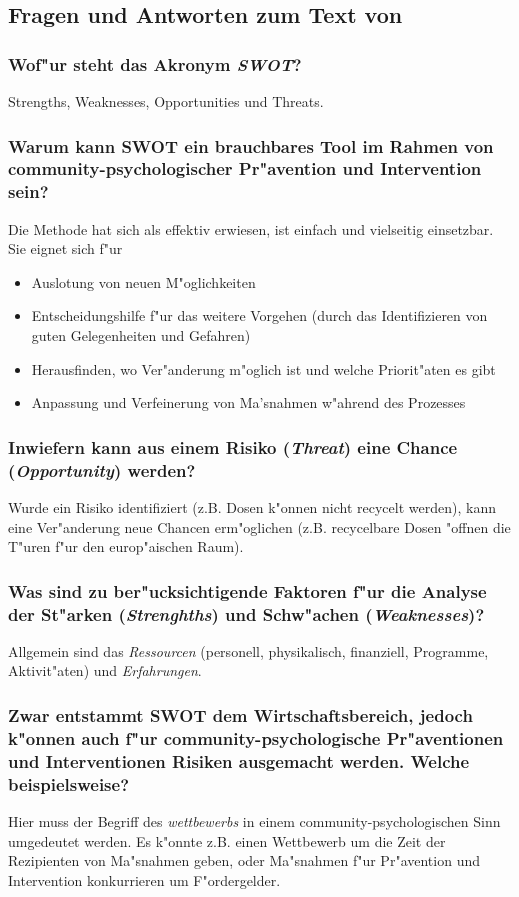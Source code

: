 \subsection{Fragen und Antworten zum Text von \textcite{renault_section_2013}}
\subsubsection{Wof"ur steht das Akronym \emph{SWOT}?}
Strengths, Weaknesses, Opportunities und Threats.

\subsubsection{Warum kann SWOT ein brauchbares Tool im Rahmen von community-psychologischer Pr"avention und Intervention sein?}
Die Methode hat sich als effektiv erwiesen, ist einfach und vielseitig einsetzbar. Sie eignet sich f"ur
\begin{itemize}
        \item Auslotung von neuen M"oglichkeiten
        \item Entscheidungshilfe f"ur das weitere Vorgehen (durch das Identifizieren von guten Gelegenheiten und Gefahren)
        \item Herausfinden, wo Ver"anderung m"oglich ist und welche Priorit"aten es gibt
        \item Anpassung und Verfeinerung von Ma'snahmen w"ahrend des Prozesses
\end{itemize}

\subsubsection{Inwiefern kann aus einem Risiko (\emph{Threat}) eine Chance (\emph{Opportunity}) werden?}
Wurde ein Risiko identifiziert (z.B. Dosen k"onnen nicht recycelt werden), kann eine Ver"anderung neue Chancen erm"oglichen (z.B. recycelbare Dosen "offnen die T"uren f"ur den europ"aischen Raum).

\subsubsection{Was sind zu ber"ucksichtigende Faktoren f"ur die Analyse der St"arken (\emph{Strenghths}) und Schw"achen (\emph{Weaknesses})?}
Allgemein sind das \emph{Ressourcen} (personell, physikalisch, finanziell, Programme, Aktivit"aten) und \emph{Erfahrungen}. 

\subsubsection{Zwar entstammt SWOT dem Wirtschaftsbereich, jedoch k"onnen auch f"ur community-psychologische Pr"aventionen und Interventionen Risiken ausgemacht werden. Welche beispielsweise?}
Hier muss der Begriff des \emph{wettbewerbs} in einem community-psychologischen Sinn umgedeutet werden. Es k"onnte z.B. einen Wettbewerb um die Zeit der Rezipienten von Ma"snahmen geben, oder Ma"snahmen f"ur Pr"avention und Intervention konkurrieren um F"ordergelder.

